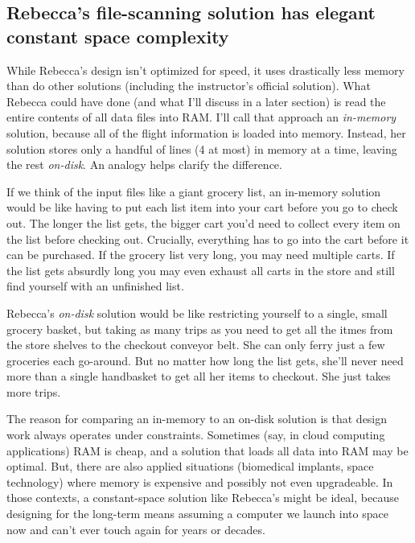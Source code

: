 \subsection{Rebecca's file-scanning solution has elegant constant space complexity}\label{rebeccas-file-scanning-solution-has-elegant-constant-space-complexity}

While Rebecca's design isn't optimized for speed, it uses drastically less memory than do other solutions (including the instructor's official solution). What Rebecca could have done (and what I'll discuss in a later section) is read the entire contents of all data files into RAM. I'll call that approach an \emph{in-memory} solution, because all of the flight information is loaded into memory. Instead, her solution stores only a handful of lines (4 at most) in memory at a time, leaving the rest \emph{on-disk}. An analogy helps clarify the difference.

If we think of the input files like a giant grocery list, an in-memory solution would be like having to put each list item into your cart before you go to check out. The longer the list gets, the bigger cart you'd need to collect every item on the list before checking out. Crucially, everything has to go into the cart before it can be purchased. If the grocery list very long, you may need multiple carts. If the list gets absurdly long you may even exhaust all carts in the store and still find yourself with an unfinished list.

Rebecca's \emph{on-disk} solution would be like restricting yourself to a single, small grocery basket, but taking as many trips as you need to get all the itmes from the store shelves to the checkout conveyor belt. She can only ferry just a few groceries each go-around. But no matter how long the list gets, she'll never need more than a single handbasket to get all her items to checkout. She just takes more trips.

The reason for comparing an in-memory to an on-disk solution is that design work always operates under constraints. Sometimes (say, in cloud computing applications) RAM is cheap, and a solution that loads all data into RAM may be optimal. But, there are also applied situations (biomedical implants, space technology) where memory is expensive and possibly not even upgradeable. In those contexts, a constant-space solution like Rebecca's might be ideal, because designing for the long-term means assuming a computer we launch into space now and can't ever touch again for years or decades.

